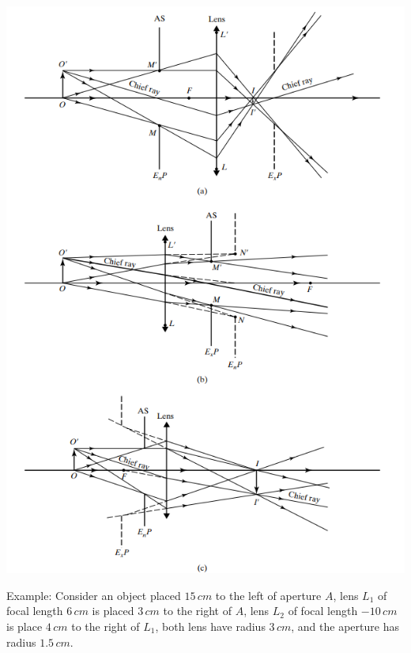 \documentclass[11pt]{book}
\theoremstyle{break}
\theoremstyle{break}
\newcommand{\example}{\color{green}Example: \color{black}}
\begin{document}
\newpage
\hfill\break
\hfill\break
\begin{center}
\includegraphics[scale=0.9]{pupils.png}
\end{center}
\newpage

\example Consider an object placed $15\, cm$ to the left of aperture $A$, lens $L_1$ of focal length $6\, cm$ is placed $3\, cm$ to the right of $A$, lens $L_2$ of focal length $-10\, cm$ is place $4\, cm$ to the right of $L_1$, both lens have radius $3\, cm$, and the aperture has radius $1.5\, cm$. \\
\end{document}
